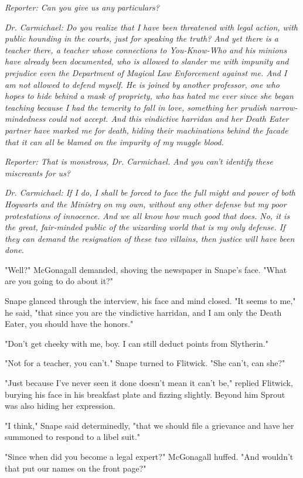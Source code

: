 \documentclass[a4paper,11pt]{article}
\begin{document}
\emph{Reporter: Can you give us any particulars?}

\emph{Dr. Carmichael: Do you realize that I have been threatened with legal action, with public hounding in the courts, just for speaking the truth? And yet there is a teacher there, a teacher whose connections to You-Know-Who and his minions have already been documented, who is allowed to slander me with impunity and prejudice even the Department of Magical Law Enforcement against me. And I am not allowed to defend myself. He is joined by another professor, one who hopes to hide behind a mask of propriety, who has hated me ever since she began teaching because I had the temerity to fall in love, something her prudish narrow-mindedness could not accept. And this vindictive harridan and her Death Eater partner have marked me for death, hiding their machinations behind the facade that it can all be blamed on the impurity of my muggle blood.}

\emph{Reporter: That is monstrous, Dr. Carmichael. And you can't identify these miscreants for us?}

\emph{Dr. Carmichael: If I do, I shall be forced to face the full might and power of both Hogwarts and the Ministry on my own, without any other defense but my poor protestations of innocence. And we all know how much good that does. No, it is the great, fair-minded public of the wizarding world that is my only defense. If they can demand the resignation of these two villains, then justice will have been done.}

"Well?" McGonagall demanded, shoving the newspaper in Snape's face. "What are you going to do about it?"

Snape glanced through the interview, his face and mind closed. "It seems to me," he said, "that since you are the vindictive harridan, and I am only the Death Eater, you should have the honors."

"Don't get cheeky with me, boy. I can still deduct points from Slytherin."

"Not for a teacher, you can't." Snape turned to Flitwick. "She can't, can she?"

"Just because I've never seen it done doesn't mean it can't be," replied Flitwick, burying his face in his breakfast plate and fizzing slightly. Beyond him Sprout was also hiding her expression.

"I think," Snape said determinedly, "that we should file a grievance and have her summoned to respond to a libel suit."

"Since when did you become a legal expert?" McGonagall huffed. "And wouldn't that put our names on the front page?"
\end{document}

